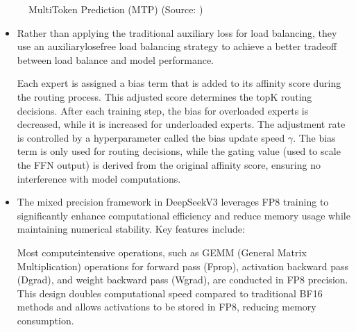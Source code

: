 \documentclass[letterpaper,11pt,english]{sphinxmanual}
\begin{document}
\begin{itemize}
\begin{figure}[htbp]
\centering
\capstart

\noindent{}
\caption{Multi\sphinxhyphen{}Token Prediction (MTP) (Source: )}\label{\detokenize{pretraining:id31}}\end{figure}

\end{itemize}

\sphinxAtStartPar
{}
\begin{itemize}
\item {} 
\sphinxAtStartPar
{}

\sphinxAtStartPar
Rather than applying the traditional auxiliary loss for load
balancing, they use an auxiliary\sphinxhyphen{}lose\sphinxhyphen{}free load balancing strategy to
achieve a better trade\sphinxhyphen{}off between load balance and model performance.

\sphinxAtStartPar
Each expert is assigned a bias term that is added to its affinity
score during the routing process. This adjusted score determines the
top\sphinxhyphen{}K routing decisions. After each training step, the bias for
overloaded experts is decreased, while it is increased for underloaded
experts. The adjustment rate is controlled by a hyperparameter called
the bias update speed \(\gamma\). The bias term is only used for
routing decisions, while the gating value (used to scale the FFN
output) is derived from the original affinity score, ensuring no
interference with model computations.

\item {} 
\sphinxAtStartPar
{}

\sphinxAtStartPar
The mixed precision framework in DeepSeek\sphinxhyphen{}V3 leverages FP8 training to
significantly enhance computational efficiency and reduce memory usage
while maintaining numerical stability. Key features include:

\sphinxAtStartPar
Most compute\sphinxhyphen{}intensive operations, such as GEMM (General Matrix
Multiplication) operations for forward pass (Fprop), activation
backward pass (Dgrad), and weight backward pass (Wgrad), are conducted
in FP8 precision. This design doubles computational speed compared to
traditional BF16 methods and allows activations to be stored in FP8,
reducing memory consumption.


\end{itemize}
\end{document}
